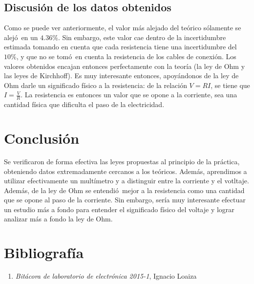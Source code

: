 \documentclass{article}
\begin{document}
\subsection{Discusi\'on de los datos obtenidos}
Como se puede ver anteriormente, el valor m\'as alejado del te\'orico s\'olamente se alej\'o\ en un $4.36\%$. Sin embargo, este valor cae dentro de la incertidumbre estimada tomando en cuenta que cada resistencia tiene una incertidumbre del $10\%$, y que no se tom\'o\ en cuenta la resistencia de los cables de conexi\'on. Los valores obtenidos encajan entonces perfectamente con la teor\'ia (la ley de Ohm y las leyes de Kirchhoff). Es muy interesante entonces, apoy\'andonos de la ley de Ohm darle un significado f\'isico a la resistencia: de la relaci\'on $V=RI$, se tiene que $I=\frac{V}{R}$. La resistencia es entonces un valor que se opone a la corriente, sea una cantidad f\'isica que dificulta el paso de la electricidad.

\section{Conclusi\'on}
Se verificaron de forma efectiva las leyes propuestas al principio de la pr\'actica, obteniendo datos extremadamente cercanos a los te\'oricos. Adem\'as, aprendimos a utilizar efectivamente un mult\'imetro y a distinguir entre la corriente y el votltaje. Adem\'as, de la ley de Ohm se entendi\'o\ mejor a la resistencia como una cantidad que se opone al paso de la corriente. Sin embargo, ser\'ia muy interesante efectuar un estudio m\'as a fondo para entender el significado f\'isico del voltaje y lograr analizar m\'as a fondo la ley de Ohm.

\section{Bibliograf\'ia}
\begin{enumerate}
\item \textit{Bit\'acora de laboratorio de electr\'onica 2015-1}, Ignacio Loaiza
\end{enumerate}
\end{document}
